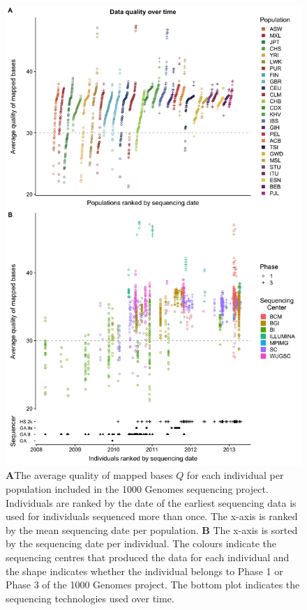 \documentclass[9pt,lineno]{elife}
\begin{document}
\begin{figure}
\includegraphics[width=0.95\hsize,keepaspectratio]{./Figures/MapQualOverTime.jpg}

\caption{\textbf{A}The average quality of mapped bases $Q$ for each individual per population included in the 1000 Genomes sequencing project. Individuals are ranked by the date of the earliest sequencing data is used for individuals sequenced more than once. The x-axis is ranked by the mean sequencing date per population. \textbf{B} The x-axis is sorted by the sequencing date per individual. The colours indicate the sequencing centres that produced the data for each individual and the shape indicates whether the individual belongs to Phase 1 or Phase 3 of the 1000 Genomes project. The bottom plot indicates the sequencing technologies used over time.}
\label{MapQual}
\end{figure}
\end{document}
